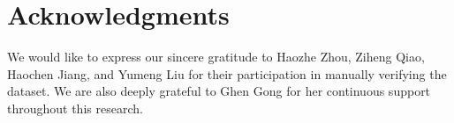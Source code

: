 \section*{Acknowledgments}
We would like to express our sincere gratitude to Haozhe Zhou, Ziheng Qiao, Haochen Jiang, and Yumeng Liu for their participation in manually verifying the dataset.
We are also deeply grateful to Ghen Gong for her continuous support throughout this research.
